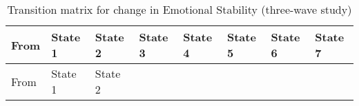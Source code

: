 \documentclass[
  single column]{article}
\begin{document}
\begin{longtable}[]{@{}
  >{\centering\arraybackslash}p{}
  >{\centering\arraybackslash}p{}
  >{\centering\arraybackslash}p{}
  >{\centering\arraybackslash}p{}
  >{\centering\arraybackslash}p{}
  >{\centering\arraybackslash}p{}
  >{\centering\arraybackslash}p{}
  >{\centering\arraybackslash}p{}@{}}
\caption{Transition matrix for change in Emotional Stability (three-wave
study)}\label{tbl-table-transition-emotional-stability}\tabularnewline
\toprule\noalign{}
\begin{minipage}[b]{\linewidth}\centering
From
\end{minipage} & \begin{minipage}[b]{\linewidth}\centering
State 1
\end{minipage} & \begin{minipage}[b]{\linewidth}\centering
State 2
\end{minipage} & \begin{minipage}[b]{\linewidth}\centering
State 3
\end{minipage} & \begin{minipage}[b]{\linewidth}\centering
State 4
\end{minipage} & \begin{minipage}[b]{\linewidth}\centering
State 5
\end{minipage} & \begin{minipage}[b]{\linewidth}\centering
State 6
\end{minipage} & \begin{minipage}[b]{\linewidth}\centering
State 7
\end{minipage} \\
\midrule\noalign{}
\endfirsthead
\toprule\noalign{}
\begin{minipage}[b]{\linewidth}\centering
From
\end{minipage} & \begin{minipage}[b]{\linewidth}\centering
State 1
\end{minipage} & \begin{minipage}[b]{\linewidth}\centering
State 2
\end{minipage} & \begin{minipage}[b]{\linewidth}\centering

\end{minipage}
\end{longtable}
\end{document}
